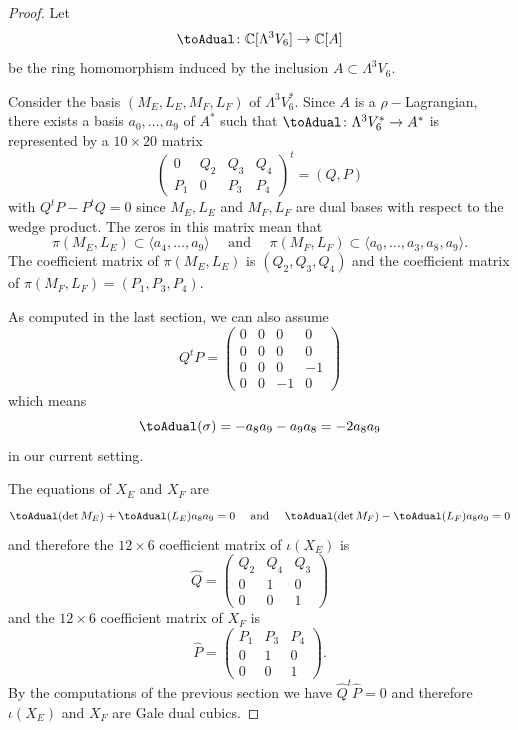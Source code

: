 \documentclass[11pt]{amsart}
\theoremstyle{plain}
\numberwithin{equation}{section}
\theoremstyle{definition}
\theoremstyle{remark}
\newcommand{\C}{\mathbb C}
\newcommand{\quadand}{\quad \text{ and } \quad}
\begin{document}
\begin{proof} 
Let
\[
    \toAdual \colon \C[\Lambda^3 V_6] \to \C[A]
\]
be the ring homomorphism induced by the inclusion $
A \subset \Lambda^3 V_6$.

Consider the basis $(M_E,L_E,M_F,L_F)$ of $\Lambda^3 V_6^*$. Since $A$ is a $\rho-$Lagrangian, there exists a basis $a_0,\dots,a_9$ of $A^*$ such that 
$\toAdual \colon \Lambda^3 V_6^* \to A^*$
is represented by a $10 \times 20$ matrix
\[
    \begin{pmatrix}
        0 & Q_2 & Q_3 & Q_4 \\
        P_1 & 0 & P_3 & P_4 
    \end{pmatrix}^t  = (Q,P)
\]
with $Q^tP - P^tQ = 0$ since $M_E,L_E$ and $M_F,L_F$ are dual bases with respect to the wedge product.
The zeros in this matrix mean that
\[
    \pi(M_E,L_E) \subset \langle a_4,\dots,a_9 \rangle
    \quadand
     \pi(M_F,L_F) \subset \langle a_0,\dots,a_3,a_8,a_9 \rangle.
\]
The coefficient matrix of $\pi(M_E,L_E)$ is $(Q_2,Q_3,Q_4)$ and the coefficient matrix of $\pi(M_F,L_F) = (P_1,P_3,P_4)$.

As computed in the last section, we can also assume
\[
Q^tP = 
\begin{pmatrix}
0 & 0 & 0 & 0\\
0 & 0 & 0 & 0\\
0 & 0 &  0 & -1\\
0 & 0 & -1 & 0 
\end{pmatrix}
\]
which means
\[
    \toAdual(\sigma) = -a_8a_9-a_9a_8 = -2a_8a_9
\]
in our current setting.

The equations of $X_E$ and $X_F$ are  
\[
    \toAdual(\det M_E) + \toAdual(L_E)a_8a_9 = 0
    \quadand
    \toAdual(\det M_F) - \toAdual(L_F)a_8a_9 = 0
\]
and therefore the $12 \times 6$ coefficient matrix of $\iota(X_E)$
is
\[
\widehat{Q} = \begin{pmatrix}
	Q_2 & Q_4& Q_3 \\
	0& 1& 0 \\
	0 & 0 & 1
\end{pmatrix}
\]
and the $12 \times 6$ coefficient matrix of $X_F$ is
\[
\widehat{P} = \begin{pmatrix}
	P_1 & P_3 & P_4 \\
	0& 1& 0 \\
	0 & 0 & 1
\end{pmatrix}.
\]
By the computations of the previous section we have $\widehat{Q}^t\widehat{P} = 0$ and therefore $\iota(X_E)$ and $X_F$ are Gale dual cubics.
\end{proof}
    
\end{document}
